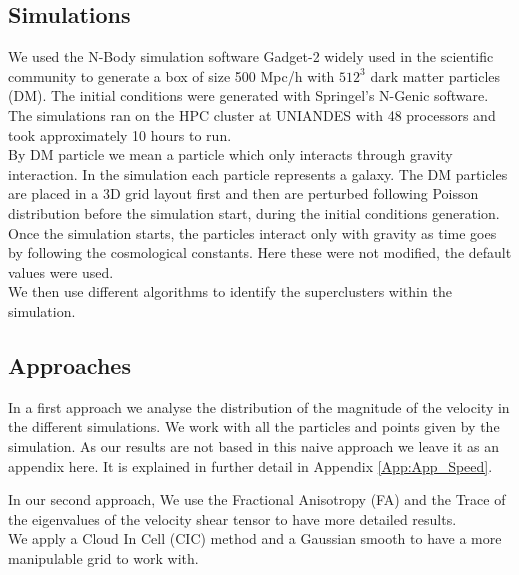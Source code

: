 \documentclass[12pt]{article}
\begin{document}
\subsection{Simulations}
We used the N-Body simulation software Gadget-2 \cite{springel_gadget_2_2005}
widely used in the scientific community to generate a box of size 500 Mpc/h
with $512^{3}$ dark matter particles (DM). The initial conditions were
generated with Springel's N-Genic software. The simulations ran on the HPC cluster at UNIANDES with 48 processors and took approximately 10 hours to run. \\

By DM particle we mean a particle which only interacts through gravity
interaction. In the simulation each particle represents a galaxy. The DM particles are
placed in a 3D grid layout first and then are perturbed following Poisson distribution
before the simulation start, during the initial conditions generation.\\

Once the simulation starts, the particles interact only with gravity as time goes by following the cosmological constants. Here these were not modified, the default values were used.\\

We then use different algorithms to identify the superclusters within the simulation.\\

\subsection{Approaches}

\begin{par}
In a first approach we analyse the distribution of the magnitude of the velocity in the different simulations. We work with all the particles and points given by the simulation. As our results are not based in this naive approach we leave it as an appendix here. It is explained in further detail in Appendix \ref{App:App_Speed}.
\end{par}

\begin{par}

In our second approach, We use the Fractional Anisotropy (FA) and the Trace of
 the eigenvalues of the velocity shear tensor to have more detailed results.\\
We apply a Cloud In Cell (CIC) method and a Gaussian smooth to have a more manipulable grid to work with.\\
\end{par}
\end{document}
